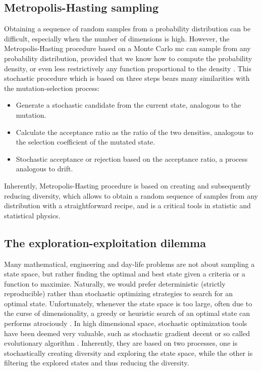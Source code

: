 \subsection{Metropolis-Hasting sampling}
Obtaining a sequence of random samples from a probability distribution can be difficult, especially when the number of dimensions is high.
However, the Metropolis-Hasting procedure based on a Monte Carlo \gls{mc} can sample from any probability distribution, provided that we know how to compute the probability density, or even less restrictively any function proportional to the density \citep{Hastings1970}.
This stochastic procedure which is based on three steps bears many similarities with the mutation-selection process:
\begin{itemize}
	\item Generate a stochastic candidate from the current state, analogous to the mutation.
	\item Calculate the acceptance ratio as the ratio of the two densities, analogous to the selection coefficient of the mutated state.
	\item Stochastic acceptance or rejection based on the acceptance ratio, a process analogous to drift. 
\end{itemize}
Inherently, Metropolis-Hasting procedure is based on creating and subsequently reducing diversity, which allows to obtain a random sequence of samples from any distribution with a straightforward recipe, and is a critical tools in statistic and statistical physics.

\subsection{The exploration-exploitation dilemma}
Many mathematical, engineering and day-life problems are not about sampling a state space, but rather finding the optimal and best state given a criteria or a function to maximize.
Naturally, we would prefer deterministic (strictly reproducible) rather than stochastic optimizing strategies to search for an optimal state.
Unfortunately, whenever the state space is too large, often due to the curse of dimensionality, a greedy or heuristic search of an optimal state can performs atrociously \citep{Bellman1966}.
In high dimensional space, stochastic optimization tools have been deemed very valuable, such as stochastic gradient decent or so called evolutionary algorithm \citep{Russell2010,Vikhar2017}.
Inherently, they are based on two processes, one is stochastically creating diversity and exploring the state space, while the other is filtering the explored states and thus reducing the diversity.

